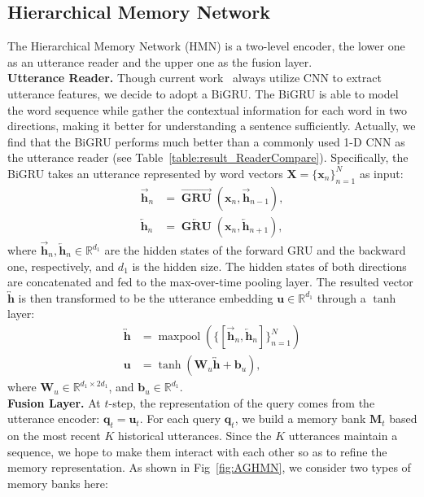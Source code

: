 \documentclass[letterpaper]{article} %
\DeclareMathOperator{\GRU}{\mathbf{GRU}}
\DeclareMathOperator{\maxpool}{maxpool}
\begin{document}
\subsection{Hierarchical Memory Network}
The Hierarchical Memory Network (HMN) is a two-level encoder, the lower one as an utterance reader and the upper one as the fusion layer.
\\[1ex]
\noindent\textbf{Utterance Reader.}
Though current work~\cite{DBLP:conf/emnlp/HazarikaPMCZ18,DBLP:conf/naacl/HazarikaPZCMZ18,DBLP:conf/aaai/MajumderPHMGC19} always utilize CNN to extract utterance features, we decide to adopt a BiGRU. The BiGRU is able to model the word sequence while gather the contextual information for each word in two directions, making it better for understanding a sentence sufficiently. Actually, we find that the BiGRU performs much better than a commonly used 1-D CNN as the utterance reader (see Table~\ref{table:result_ReaderCompare}). Specifically, the BiGRU takes an utterance represented by word vectors $\mathbf{X}=\{\mathbf{x}_n\}_{n=1}^{N}$ as input:
\begin{align}
    \overrightarrow{\mathbf{h}}_{n} &= \overrightarrow{\GRU}(\mathbf{x}_n, \overrightarrow{\mathbf{h}}_{n-1}), \\
    \overleftarrow{\mathbf{h}}_{n} &= \overleftarrow{\GRU}(\mathbf{x}_n, \overleftarrow{\mathbf{h}}_{n+1}),
\end{align}
where $\overrightarrow{\mathbf{h}}_{n},\overleftarrow{\mathbf{h}}_{n}\in\mathbb{R}^{d_1}$ are the hidden states of the forward GRU and the backward one, respectively, and $d_1$ is the hidden size. The hidden states of both directions are concatenated and fed to the max-over-time pooling layer. The resulted vector $\overleftrightarrow{\mathbf{h}}$ is then transformed to be the utterance embedding $\mathbf{u}\in \mathbb{R}^{d_1}$ through a $\tanh$ layer:
\begin{align}
\overleftrightarrow{\mathbf{h}} &= \maxpool(\{[\overrightarrow{\mathbf{h}}_{n},\overleftarrow{\mathbf{h}}_{n}]\}_{n=1}^N) \\
\mathbf{u} &= \tanh(\mathbf{W}_u\overleftrightarrow{\mathbf{h}} + \mathbf{b}_u),
\end{align}
where $\mathbf{W}_u\in \mathbb{R}^{d_1\times 2d_1}$, and $\mathbf{b}_u\in \mathbb{R}^{d_1}$.
\\[1ex]
\noindent\textbf{Fusion Layer.}
At $t$-step, the representation of the query comes from the utterance encoder: $\mathbf{q}_t = \mathbf{u}_t$.
For each query $\mathbf{q}_t$, we build a memory bank $\mathbf{M}_t$ based on the most recent $K$ historical utterances. Since the $K$ utterances maintain a sequence, we hope to make them interact with each other so as to refine the memory representation. As shown in Fig~\ref{fig:AGHMN}, we consider two types of memory banks here:
\end{document}
